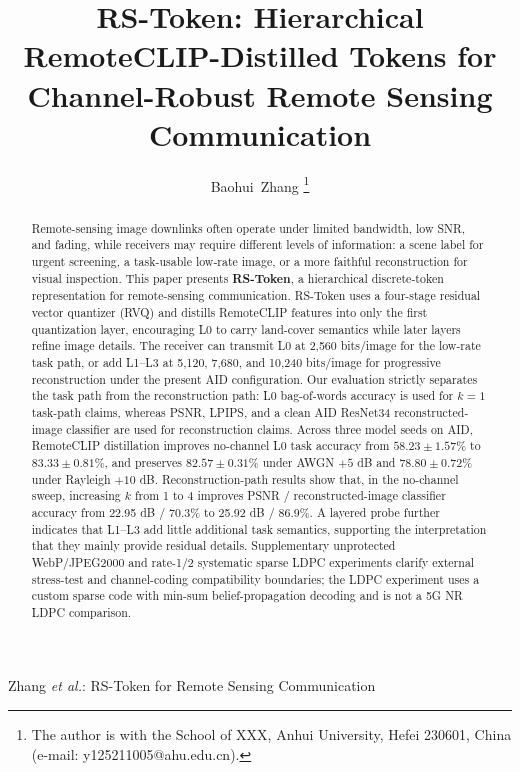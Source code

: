 \documentclass[lettersize,journal]{IEEEtran}
\begin{document}
\title{RS-Token: Hierarchical RemoteCLIP-Distilled Tokens for Channel-Robust Remote Sensing Communication}

\author{Baohui~Zhang%
\thanks{The author is with the School of XXX, Anhui University, Hefei 230601, China (e-mail: y125211005@ahu.edu.cn).}%
}

%
{Zhang \MakeLowercase{\textit{et al.}}: RS-Token for Remote Sensing Communication}

\maketitle

\begin{abstract}
Remote-sensing image downlinks often operate under limited bandwidth, low SNR, and fading, while receivers may require different levels of information: a scene label for urgent screening, a task-usable low-rate image, or a more faithful reconstruction for visual inspection. This paper presents \textbf{RS-Token}, a hierarchical discrete-token representation for remote-sensing communication. RS-Token uses a four-stage residual vector quantizer (RVQ) and distills RemoteCLIP features into only the first quantization layer, encouraging L0 to carry land-cover semantics while later layers refine image details. The receiver can transmit L0 at 2{,}560 bits/image for the low-rate task path, or add L1--L3 at 5{,}120, 7{,}680, and 10{,}240 bits/image for progressive reconstruction under the present AID configuration. Our evaluation strictly separates the task path from the reconstruction path: L0 bag-of-words accuracy is used for $k=1$ task-path claims, whereas PSNR, LPIPS, and a clean AID ResNet34 reconstructed-image classifier are used for reconstruction claims. Across three model seeds on AID, RemoteCLIP distillation improves no-channel L0 task accuracy from $58.23\pm1.57\%$ to $83.33\pm0.81\%$, and preserves $82.57\pm0.31\%$ under AWGN $+5$ dB and $78.80\pm0.72\%$ under Rayleigh $+10$ dB. Reconstruction-path results show that, in the no-channel sweep, increasing $k$ from 1 to 4 improves PSNR / reconstructed-image classifier accuracy from 22.95 dB / 70.3\% to 25.92 dB / 86.9\%. A layered probe further indicates that L1--L3 add little additional task semantics, supporting the interpretation that they mainly provide residual details. Supplementary unprotected WebP/JPEG2000 and rate-1/2 systematic sparse LDPC experiments clarify external stress-test and channel-coding compatibility boundaries; the LDPC experiment uses a custom sparse code with min-sum belief-propagation decoding and is not a 5G NR LDPC comparison.
\end{abstract}
\end{document}
